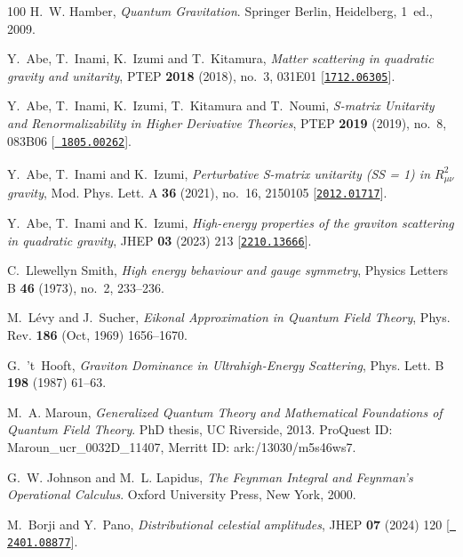 \begin{thebibliography}{100}
H.~W. Hamber, {\em Quantum Gravitation}.
\newblock Springer Berlin, Heidelberg, 1~ed., 2009.

Y.~Abe, T.~Inami, K.~Izumi and T.~Kitamura,  {\em {Matter scattering in
  quadratic gravity and unitarity}}, PTEP {\bf 2018} (2018), no.~3, 031E01
  [\href{http://www.arXiv.org/abs/1712.06305}{{\tt 1712.06305}}].

Y.~Abe, T.~Inami, K.~Izumi, T.~Kitamura and T.~Noumi,  {\em {S-matrix Unitarity
  and Renormalizability in Higher Derivative Theories}}, PTEP {\bf 2019}
  (2019), no.~8, 083B06 [\href{http://www.arXiv.org/abs/1805.00262}{{\tt
  1805.00262}}].

Y.~Abe, T.~Inami and K.~Izumi,  {\em {Perturbative S-matrix unitarity
  (S\textsuperscript{\dag}S = 1) in $R^2_{\mu\nu}$ gravity}}, Mod. Phys. Lett.
  A {\bf 36} (2021), no.~16, 2150105
  [\href{http://www.arXiv.org/abs/2012.01717}{{\tt 2012.01717}}].

Y.~Abe, T.~Inami and K.~Izumi,  {\em {High-energy properties of the graviton
  scattering in quadratic gravity}}, JHEP {\bf 03} (2023) 213
  [\href{http://www.arXiv.org/abs/2210.13666}{{\tt 2210.13666}}].

C.~{Llewellyn Smith},  {\em High energy behaviour and gauge symmetry}, Physics
  Letters B {\bf 46} (1973), no.~2, 233--236.

M.~L\'evy and J.~Sucher,  {\em Eikonal Approximation in Quantum Field Theory},
  Phys. Rev. {\bf 186} (Oct, 1969) 1656--1670.

G.~'t~Hooft,  {\em {Graviton Dominance in Ultrahigh-Energy Scattering}}, Phys.
  Lett. B {\bf 198} (1987) 61--63.

M.~A. Maroun, {\em Generalized Quantum Theory and Mathematical Foundations of
  Quantum Field Theory}.
\newblock PhD thesis, UC Riverside, 2013.
\newblock ProQuest ID: Maroun\_ucr\_0032D\_11407, Merritt ID:
  ark:/13030/m5s46ws7.

G.~W. Johnson and M.~L. Lapidus, {\em The Feynman Integral and Feynman’s
  Operational Calculus}.
\newblock Oxford University Press, New York, 2000.

M.~Borji and Y.~Pano,  {\em {Distributional celestial amplitudes}}, JHEP {\bf
  07} (2024) 120 [\href{http://www.arXiv.org/abs/2401.08877}{{\tt
  2401.08877}}].


\end{thebibliography}
